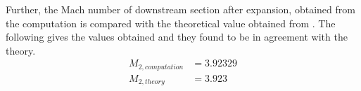 \par Further, the Mach number of downstream section after expansion, obtained
from the computation is compared with the theoretical value obtained
from \cite{ref_1}. The following gives the values obtained and they found to
be in agreement with the theory.
\begin{align*}
    M_{2,computation} &= 3.92329 \\
    M_{2,theory} &= 3.923
\end{align*}

\pagebreak
